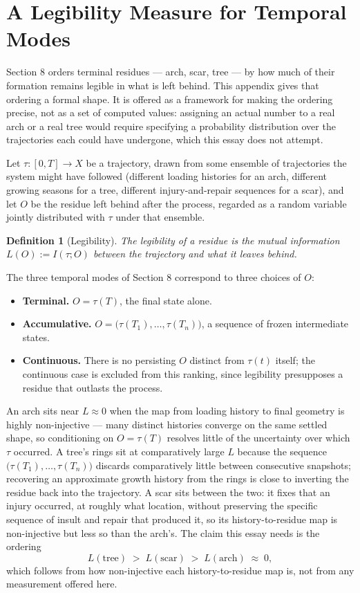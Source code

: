 \documentclass[11pt]{article}
\newtheorem{definition}{Definition}
\begin{document}
\section{A Legibility Measure for Temporal Modes}

Section 8 orders terminal residues --- arch, scar, tree --- by how much of their formation remains legible in what is left behind. This appendix gives that ordering a formal shape. It is offered as a framework for making the ordering precise, not as a set of computed values: assigning an actual number to a real arch or a real tree would require specifying a probability distribution over the trajectories each could have undergone, which this essay does not attempt.

Let $\tau:[0,T]\to X$ be a trajectory, drawn from some ensemble of trajectories the system might have followed (different loading histories for an arch, different growing seasons for a tree, different injury-and-repair sequences for a scar), and let $O$ be the residue left behind after the process, regarded as a random variable jointly distributed with $\tau$ under that ensemble.

\begin{definition}[Legibility]
The legibility of a residue is the mutual information $L(O) := I(\tau; O)$ between the trajectory and what it leaves behind.
\end{definition}

The three temporal modes of Section 8 correspond to three choices of $O$:
\begin{itemize}
\item \textbf{Terminal.} $O = \tau(T)$, the final state alone.
\item \textbf{Accumulative.} $O = \big(\tau(T_1),\ldots,\tau(T_n)\big)$, a sequence of frozen intermediate states.
\item \textbf{Continuous.} There is no persisting $O$ distinct from $\tau(t)$ itself; the continuous case is excluded from this ranking, since legibility presupposes a residue that outlasts the process.
\end{itemize}

An arch sits near $L \approx 0$ when the map from loading history to final geometry is highly non-injective --- many distinct histories converge on the same settled shape, so conditioning on $O = \tau(T)$ resolves little of the uncertainty over which $\tau$ occurred. A tree's rings sit at comparatively large $L$ because the sequence $\big(\tau(T_1),\ldots,\tau(T_n)\big)$ discards comparatively little between consecutive snapshots; recovering an approximate growth history from the rings is close to inverting the residue back into the trajectory. A scar sits between the two: it fixes that an injury occurred, at roughly what location, without preserving the specific sequence of insult and repair that produced it, so its history-to-residue map is non-injective but less so than the arch's. The claim this essay needs is the ordering
\[
L(\text{tree}) \;>\; L(\text{scar}) \;>\; L(\text{arch}) \;\approx\; 0,
\]
which follows from how non-injective each history-to-residue map is, not from any measurement offered here.
\end{document}

